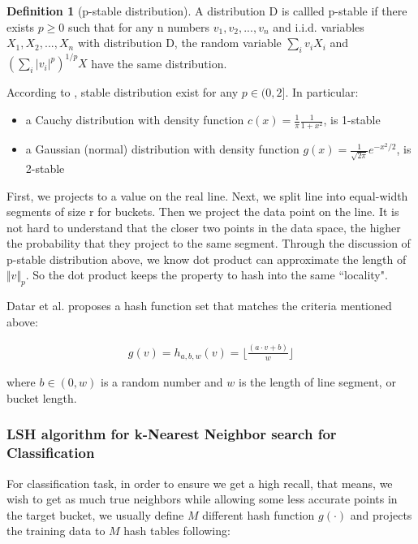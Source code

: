 \documentclass[letterpaper,twocolumn,10pt]{article}
\newcommand{\floor}[1]{\lfloor #1 \rfloor}
\theoremstyle{definition}
\newtheorem{definition}{Definition}[section]
\begin{document}
\begin{definition}[p-stable distribution]
	A distribution D is callled p-stable if there exists $p \geq 0$ such that for any n numbers $v_1, v_2,...,v_n$ and i.i.d. variables $X_1, X_2,...,X_n$ with distribution D, the random variable $\sum_i{v_i X_i} $ and $ (\sum_i |v_i|^p)^{1/p}X$ have the same distribution.


\end{definition}
According to \cite{zolotarev1986one}, stable distribution exist for any $p \in (0, 2]$. In particular:
\begin{itemize}	
	\item a Cauchy distribution with density function $c(x) = \frac{1}{\pi}\frac{1}{1+x^2}$, is 1-stable
	\item a Gaussian (normal) distribution with density function $g(x) = \frac{1}{\sqrt{2\pi}}e^{-x^2/2}$, is 2-stable
\end{itemize}

First, we projects to a value on the real line. Next, we split line into equal-width segments of size r for 
buckets. Then we project the data point on the line. It is not hard to understand that the closer two 
points in the data space, the higher the probability that they project to the same segment. Through the 
discussion of p-stable distribution above, we know dot product can approximate the length of $\Vert 
v\Vert_p$. So the dot product keeps the property to hash into the same ``locality".

Datar et al. \cite{datar2004locality} proposes a hash function set that matches the criteria mentioned 
above:

\begin{align*}
g(v) = h_{a,b,w}(v) = \floor{\frac{(a\cdot v + b)}{w} }
\end{align*}

where $b \in (0, w)$ is a random number and $w$ is the length of line segment, or bucket length.

\subsubsection{LSH algorithm for k-Nearest Neighbor search for Classification}
For classification task, in order to ensure we get a high recall, 
that means, we wish to get as much true neighbors while allowing 
some less accurate points in the target bucket, we usually define 
$M$ different hash function $g(\cdot)$ and projects the training 
data to $M$ hash tables following:
\end{document}
